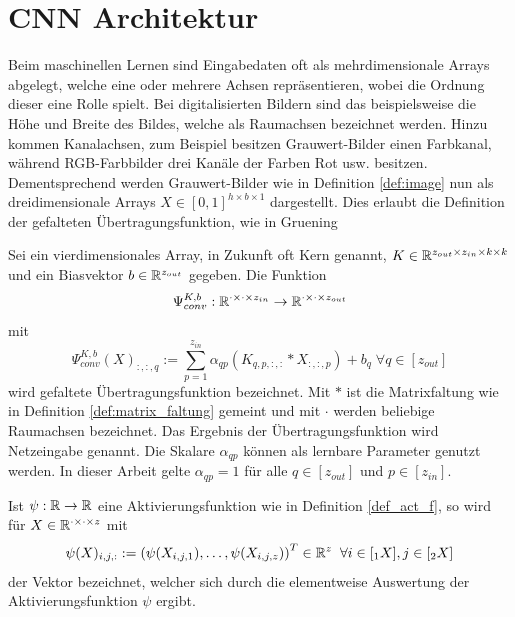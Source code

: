 \section{CNN Architektur}
\label{abs:CNN_arch}
Beim maschinellen Lernen sind Eingabedaten oft als mehrdimensionale Arrays abgelegt, welche eine oder mehrere Achsen repräsentieren, wobei die Ordnung dieser eine Rolle spielt. Bei digitalisierten Bildern sind das beispielsweise die Höhe und Breite des Bildes, welche als Raumachsen bezeichnet werden. Hinzu kommen Kanalachsen, zum Beispiel besitzen Grauwert-Bilder einen Farbkanal, während RGB-Farbbilder drei Kanäle der Farben Rot usw. besitzen. Dementsprechend werden Grauwert-Bilder wie in Definition \ref{def:image} nun als dreidimensionale Arrays $X \in [0,1]^{h \times b \times 1}$ dargestellt. Dies erlaubt die Definition der gefalteten Übertragungsfunktion, wie in Gruening\cite{gruening}

\begin{defi}
    \label{eq:convlogit}
    Sei ein vierdimensionales Array, in Zukunft oft Kern genannt, $K \in \mathbb{R}^{z_{out} \times z_{in} \times k \times k}$ und ein Biasvektor $b \in \mathbb{R}^{z_{out}}$ gegeben. Die Funktion 
    \begin{equation*}
        \Psi_{conv}^{K,b}: \mathbb{R}^{\cdot \times \cdot \times z_{in}} \rightarrow \mathbb{R}^{\cdot \times \cdot\times z_{out}}
    \end{equation*}
    mit
    \begin{equation*}
        \Psi_{conv}^{K,b}(X)_{:,:,q}:= \sum_{p=1}^{z_{in}} \alpha_{qp} \left(K_{q,p,:,:} \ast X_{:,:,p} \right) +b_q \; \forall q \in [z_{out}]
    \end{equation*}
    wird gefaltete Übertragungsfunktion bezeichnet. Mit $\ast$ ist die Matrixfaltung wie in Definition \ref{def:matrix_faltung} gemeint und mit $\cdot$ werden beliebige Raumachsen bezeichnet. Das Ergebnis der Übertragungsfunktion wird Netzeingabe genannt. Die Skalare $\alpha_{qp}$ können als lernbare Parameter genutzt werden. In dieser Arbeit gelte $\alpha_{qp}=1$ für alle $q \in [z_{out}]$ und $p \in [z_{in}]$.
\end{defi}


\begin{bem}
    Ist $\psi: \mathbb{R} \rightarrow \mathbb{R}$ eine Aktivierungsfunktion wie in Definition \ref{def_act_f}, so wird für $X \in \mathbb{R}^{\cdot \times \cdot \times z}$ mit 
    \[\psi(X)_{i,j,:}:=\left(\psi(X_{i,j,1}), \ldots, \psi(X_{i,j,z})\right)^T \in \mathbb{R}^z \; \; \forall i \in [{}_1 X], j \in [{}_2 X] 
    \]
    der Vektor bezeichnet, welcher sich durch die elementweise Auswertung der Aktivierungsfunktion $\psi$ ergibt.
\end{bem}

